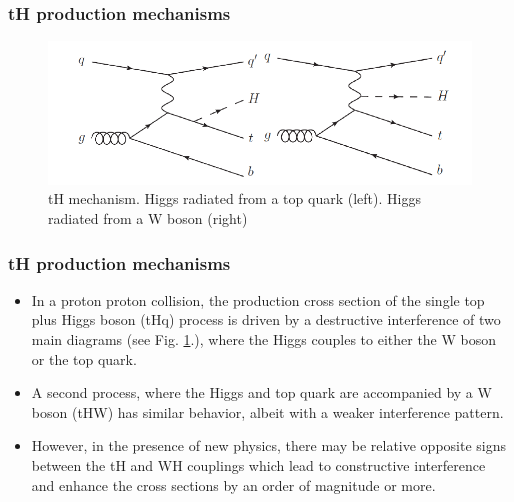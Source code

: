 \documentclass[11pt]{beamer}
\begin{document}
\begin{frame}
\frametitle{tH production mechanisms}
\begin{center}
\begin{figure} 
\includegraphics[scale=0.4]{figures/tq.png} 
\caption{tH mechanism. Higgs radiated from a top quark (left). Higgs radiated from a W boson (right)} 
\label{th}
\end{figure}
\end{center}
\end{frame}

\begin{frame}
\frametitle{tH production mechanisms}
\begin{itemize}
\item In a proton proton collision, the production cross section of the single top plus Higgs boson (tHq) process is driven by a
destructive interference of two main diagrams (see Fig. \ref{th}.), where the Higgs couples to either
the W boson or the top quark. 
\item  A second process, where the Higgs and top quark
are accompanied by a W boson (tHW) has similar behavior, albeit with a weaker interference
pattern.
\item However, in the presence of new physics, there may be relative opposite signs between the tH
and WH couplings which lead to constructive interference and enhance the cross sections by
an order of magnitude or more.
\end{itemize}
\end{frame}
\end{document}
